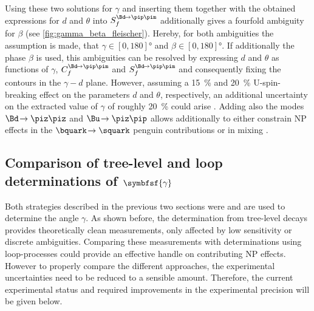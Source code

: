 Using these two solutions for $\gamma$ and inserting them together with the obtained expressions for $d$ and $\theta$ into $S_{f}^{\Bd\!\to\pip\pim}$ additionally gives a fourfold ambiguity for $\beta$ (see \cref{fig:gamma_beta_fleischer}).
Hereby, for both ambiguities the assumption is made, that $\gamma\in[0, 180]\si{\degree}$ and $\beta\in[0, 180]\si{\degree}$.
If additionally the phase $\beta$ is used, this ambiguities can be resolved by expressing $d$ and $\theta$ as functions of $\gamma$, $C_{f}^{\Bd\!\to\pip\pim}$ and $S_{f}^{\Bd\!\to\pip\pim}$ and consequently fixing the contours in the $\gamma-d$ plane.
However, assuming a \SI{15}{\percent} and \SI{20}{\percent} U-spin-breaking effect on the parameters $d$ and $\theta$, respectively, an additional uncertainty on the extracted value of $\gamma$ of roughly \SI{20}{\percent} could arise \cite{GammaInLoops_Fleischer2}.
Adding also the modes $\Bd\!\to\piz\piz$ and $\Bu\!\to\piz\pip$ allows additionally to either constrain \ac{NP} effects in the $\bquark\!\to\squark$ penguin contributions or in mixing \cite{GammaInLoops_Ciuchini}.

\subsection[head={Comparison of tree-level and loop determinations of $\gamma$},tocentry={Comparison of tree-level and loop determinations of $\gamma$}]{Comparison of tree-level and loop determinations of $\symbfsf{\gamma}$}

Both strategies described in the previous two sections were and are used to determine the angle $\gamma$.
As shown before, the determination from tree-level decays provides theoretically clean measurements, only affected by low sensitivity or discrete ambiguities.
Comparing these measurements with determinations using loop-processes could provide an effective handle on contributing \ac{NP} effects.
However to properly compare the different approaches, the experimental uncertainties need to be reduced to a sensible amount.
Therefore, the current experimental status and required improvements in the experimental precision will be given below.

